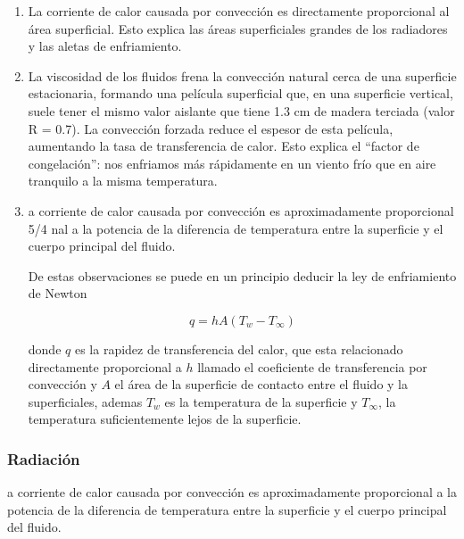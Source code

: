 \begin{enumerate}
    \item  La corriente de calor causada por convección es directamente proporcional al
    área superficial. Esto explica las áreas superficiales grandes de los radiadores y
    las aletas de enfriamiento.

    \item La viscosidad de los fluidos frena la convección natural cerca de una superficie
    estacionaria, formando una película superficial que, en una superficie vertical,
    suele tener el mismo valor aislante que tiene 1.3 cm de madera terciada (valor
    R = 0.7). La convección forzada reduce el espesor de esta película, aumentando
    la tasa de transferencia de calor. Esto explica el “factor de congelación”: nos
    enfriamos más rápidamente en un viento frío que en aire tranquilo a la misma
    temperatura.

    \item a corriente de calor causada por convección es aproximadamente proporcional 5/4 
    nal a la potencia de la diferencia de temperatura entre la superficie y el cuerpo
    principal del fluido.

    De estas observaciones se puede en un principio 
    deducir la ley de enfriamiento de Newton

    \begin{equation}
        \label{eq:enfriamiento-newton}
        q = hA(T_w - T_\infty)
    \end{equation}

    donde $q$ es la rapidez de transferencia del calor,
    que esta relacionado directamente proporcional a $h$ llamado
    el coeficiente de transferencia por convección y $A$ el área
    de la superficie de contacto entre el fluido y la superficiales,
    ademas $T_w$ es la temperatura de la superficie y $T_\infty$,
    la temperatura suficientemente lejos de la superficie.
\end{enumerate}

\subsubsection{Radiación}
a corriente de calor causada por convección es aproximadamente proporcional a la potencia de la diferencia de temperatura entre la superficie y el cuerpo
principal del fluido.